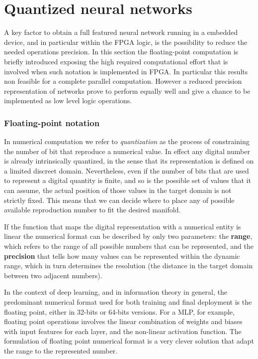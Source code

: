 %
\section{Quantized neural networks}
\label{section:quantum}

A key factor to obtain a full featured neural network running in a embedded device, and in particular within the FPGA logic, is the possibility to reduce the needed operations precision. In this section the floating-point computation is briefly introduced exposing the high required computational effort that is involved when such notation is implemented in FPGA. In particular this results non feasible for a complete parallel computation. However a reduced precision representation of networks prove to perform equally well and give a chance to be implemented as low level logic operations.

\subsubsection*{Floating-point notation}

In numerical computation we refer to \textit{quantization} as the process of constraining the number of bit that reproduce a numerical value. In effect any digital number is already intrinsically quantized, in the sense that its representation is defined on a limited discreet domain. 
Nevertheless, even if the number of bits that are used to represent a digital quantity is finite, and so is the possible set of values that it can assume, the actual position of those values in the target domain is not strictly fixed. This means that we can decide where to place any of possible available reproduction number to fit the desired manifold.

If the function that maps the digital representation with a numerical entity is linear the numerical format can be described by only two parameters: the \textbf{range}, which refers to the range of all possible numbers that can be represented, and the \textbf{precision} that tells how many values can be represented within the dynamic range, which in turn determines the resolution (the distance in the target domain between two adjacent numbers).

In the context of deep learning, and in information theory in general, the predominant numerical format used for both training and final deployment is the floating point, either in 32-bits or 64-bits versions. For a \acs{MLP}, for example, floating point operations involves the linear combination of weights and biases with input features for each layer, and the non-linear activation function. The formulation of floating point numerical format is a very clever solution that adapt the range to the represented number.

